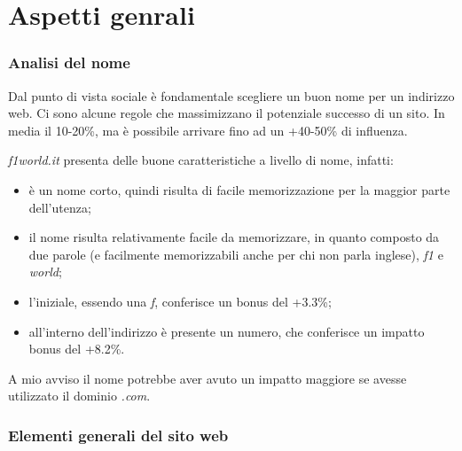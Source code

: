 \section{Aspetti genrali}

\subsubsection{Analisi del nome}
Dal punto di vista sociale \`e fondamentale scegliere un buon nome per un indirizzo web. Ci sono alcune regole che massimizzano il potenziale successo di un sito. In media il 10-20\%, ma \`e possibile arrivare fino ad un +40-50\% di influenza.

\textit{f1world.it} presenta delle buone caratteristiche a livello di nome, infatti:
\begin{itemize}

\item \`e un nome corto, quindi risulta di facile memorizzazione per la maggior parte dell'utenza;
\item il nome risulta relativamente facile da memorizzare, in quanto composto da due parole (e facilmente memorizzabili anche per chi non parla inglese), \textit{f1} e \textit{world};
\item l'iniziale, essendo una \textit{f}, conferisce un bonus del +3.3\%;
\item all'interno dell'indirizzo \`e presente un numero, che conferisce un impatto bonus del +8.2\%.
\end{itemize}

A mio avviso il nome potrebbe aver avuto un impatto maggiore se avesse utilizzato il dominio \textit{.com}.


\subsubsection{Elementi generali del sito web}
